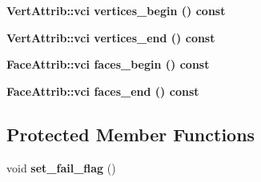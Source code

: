 \begin{CompactItemize}
\item 
\bf{Vert\-Attrib::vci} \textbf{vertices\_\-begin} () const \label{classSimSite3D_1_1geometry_1_1SimpleTrimeshThree_e80531bbf6af55529137b553dc205a61}

\item 
\bf{Vert\-Attrib::vci} \textbf{vertices\_\-end} () const \label{classSimSite3D_1_1geometry_1_1SimpleTrimeshThree_a45c5de311686b10920adbdb4ede817a}

\item 
\bf{Face\-Attrib::vci} \textbf{faces\_\-begin} () const \label{classSimSite3D_1_1geometry_1_1SimpleTrimeshThree_647b6b8412d82b702e5fe4b07ecf07d9}

\item 
\bf{Face\-Attrib::vci} \textbf{faces\_\-end} () const \label{classSimSite3D_1_1geometry_1_1SimpleTrimeshThree_daf2e57ad4a17d02afaa8e62da5e2ce2}

\end{CompactItemize}
\subsection*{Protected Member Functions}
\begin{CompactItemize}
\item 
void \textbf{set\_\-fail\_\-flag} ()\label{classSimSite3D_1_1geometry_1_1SimpleTrimeshThree_0aee50a52a6b7dd7eb12de42e516f724}

\end{CompactItemize}
